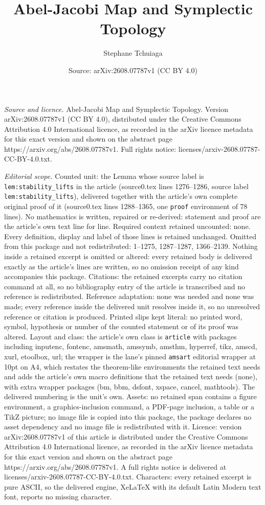 \documentclass[10pt,a4paper]{amsart}
\title[Abel-Jacobi Map and Symplectic Topology]{Abel-Jacobi Map and Symplectic Topology}
\author{Stephane Tchuiaga}
\date{Source: arXiv:2608.07787v1 (CC BY 4.0)}
\begin{document}
\maketitle

\noindent\emph{Source and licence.} Abel-Jacobi Map and Symplectic Topology. Version arXiv:2608.07787v1 (CC BY 4.0), distributed under the Creative Commons Attribution 4.0 International licence, as recorded in the arXiv licence metadata for this exact version and shown on the abstract page https://arxiv.org/abs/2608.07787v1. Full rights notice: licenses/arxiv-2608.07787-CC-BY-4.0.txt.\par\smallskip

\noindent\textit{Editorial scope.} Counted unit: the Lemma whose source label is \texttt{lem:stability\_lifts} in the article (source0.tex lines 1276--1286, source label \texttt{lem:stability\_lifts}), delivered together with the article's own complete original proof of it (source0.tex lines 1288--1365, one \texttt{proof} environment of 78 lines). No mathematics is written, repaired or re-derived: statement and proof are the article's own text line for line. Required context retained uncounted: none. Every definition, display and label of those lines is retained unchanged. Omitted from this package and not redistributed: 1--1275, 1287--1287, 1366--2139. Nothing inside a retained excerpt is omitted or altered: every retained body is delivered exactly as the article's lines are written, so no omission receipt of any kind accompanies this package. Citations: the retained excerpts carry no citation command at all, so no bibliography entry of the article is transcribed and no reference is redistributed. Reference adaptation: none was needed and none was made; every reference inside the delivered unit resolves inside it, so no unresolved reference or citation is produced. Printed slips kept literal: no printed word, symbol, hypothesis or number of the counted statement or of its proof was altered. Layout and class: the article's own class is \texttt{article} with packages including inputenc, fontenc, amsmath, amssymb, amsthm, hyperref, tikz, amscd, xurl, etoolbox, url; the wrapper is the lane's pinned \texttt{amsart} editorial wrapper at 10pt on A4, which restates the theorem-like environments the retained text needs and adds the article's own macro definitions that the retained text needs (none), with extra wrapper packages (bm, bbm, dsfont, xspace, cancel, mathtools). The delivered numbering is the unit's own. Assets: no retained span contains a figure environment, a graphics-inclusion command, a PDF-page inclusion, a table or a TikZ picture; no image file is copied into this package, the package declares no asset dependency and no image file is redistributed with it. Licence: version arXiv:2608.07787v1 of this article is distributed under the Creative Commons Attribution 4.0 International licence, as recorded in the arXiv licence metadata for this exact version and shown on the abstract page https://arxiv.org/abs/2608.07787v1. A full rights notice is delivered at licenses/arxiv-2608.07787-CC-BY-4.0.txt. Characters: every retained excerpt is pure ASCII, so the delivered engine, XeLaTeX with its default Latin Modern text font, reports no missing character.
\end{document}
